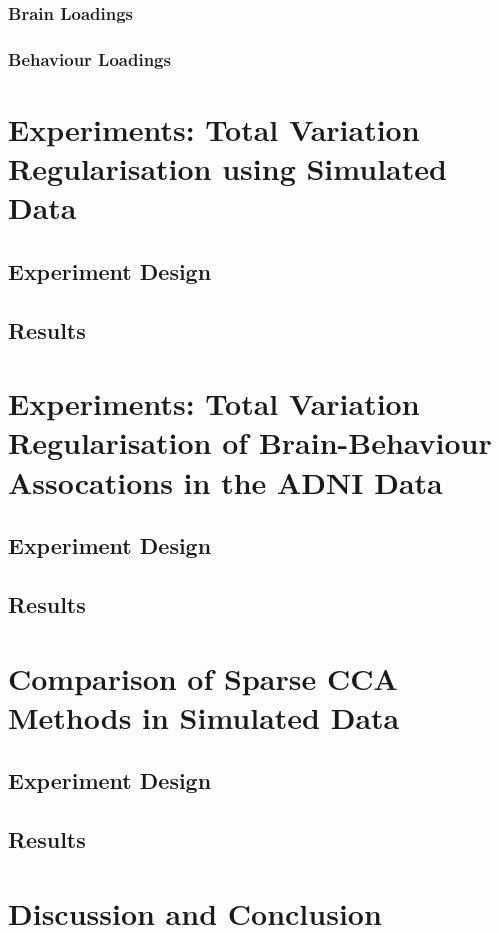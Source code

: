 \subsubsection{Brain Loadings}

\subsubsection{Behaviour Loadings}

\section{Experiments: Total Variation Regularisation using Simulated Data}
\subsection{Experiment Design}
\subsection{Results}


\section{Experiments: Total Variation Regularisation of Brain-Behaviour Assocations in the ADNI Data}
\subsection{Experiment Design}
\subsection{Results}

\section{Comparison of Sparse CCA Methods in Simulated Data}
\subsection{Experiment Design}
\subsection{Results}


\section{Discussion and Conclusion}



